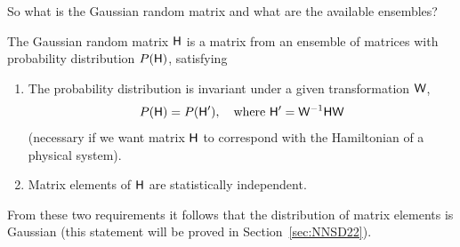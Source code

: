 \documentclass[a4paper,11pt,twoside]{article}
\begin{document}
    So what is the Gaussian random matrix and what are the available ensembles?
    \begin{theorem}\label{th:GE}
        The Gaussian random matrix $\mathsf{H}$ is a matrix from an ensemble of matrices with probability distribution $P(\mathsf{H})$, satisfying
        \begin{enumerate}
            \item The probability distribution is invariant under a given transformation $\mathsf{W}$,
                \begin{equation}
                    P(\matrix{H})=P(\matrix{H}'),\quad\text{where}\ \matrix{H'}=\matrix{W}^{-1}\matrix{H}\matrix{W}
                \end{equation}
                (necessary if we want matrix $\mathsf{H}$ to correspond with the Hamiltonian of a physical system).
            \item Matrix elements of $\mathsf{H}$ are statistically independent.
        \end{enumerate}
        From these two requirements it follows that the distribution of matrix elements is Gaussian (this statement will be proved in Section~\ref{sec:NNSD22}).
    \end{theorem}
\end{document}
